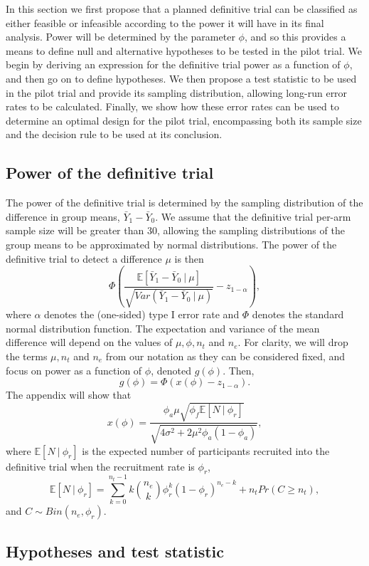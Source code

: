 \documentclass{article}
\begin{document}
In this section we first propose that a planned definitive trial can be classified as either feasible or infeasible according to the power it will have in its final analysis. Power will be determined by the parameter $\phi$, and so this provides a means to define null and alternative hypotheses to be tested in the pilot trial. We begin by deriving an expression for the definitive trial power as a function of $\phi$, and then go on to define hypotheses. We then propose a test statistic to be used in the pilot trial and provide its sampling distribution, allowing long-run error rates to be calculated. Finally, we show how these error rates can be used to determine an optimal design for the pilot trial, encompassing both its sample size and the decision rule to be used at its conclusion.

\subsection{Power of the definitive trial}\label{sec:power}

The power of the definitive trial is determined by the sampling distribution of the difference in group means, $\bar{Y}_1 - \bar{Y}_0$. We assume that the definitive trial per-arm sample size will be greater than 30, allowing the sampling distributions of the group means to be approximated by normal distributions. The power of the definitive trial to detect a difference $\mu$ is then
$$
\Phi \left(\frac{\mathbb{E}[\bar{Y}_1 - \bar{Y}_0 ~|~ \mu]}{\sqrt{Var(\bar{Y}_1 - \bar{Y}_0 ~|~ \mu)}} - z_{1-\alpha} \right),
$$
where $\alpha$ denotes the (one-sided) type I error rate and $\Phi$ denotes the standard normal distribution function. The expectation and variance of the mean difference will depend on the values of $\mu, \phi, n_t$ and $n_e$. For clarity, we will drop the terms $\mu, n_t$ and $n_e$ from our notation as they can be considered fixed, and focus on power as a function of $\phi$, denoted $g(\phi)$. Then,
$$
g(\phi) = \Phi \left( x(\phi) - z_{1-\alpha} \right).
$$
The appendix will show that
$$
x(\phi) =  \frac{ \phi_a\mu \sqrt{\phi_f \mathbb{E}[N ~|~ \phi_r]} } {\sqrt{4\sigma^2 + 2 \mu^2 \phi_a(1-\phi_a)}},
$$
where $\mathbb{E}[N ~|~ \phi_r]$ is the expected number of participants recruited into the definitive trial when the recruitment rate is $\phi_r$,
$$
\mathbb{E}[N ~|~ \phi_r] = \sum_{k=0}^{n_t-1} k{n_e \choose k} \phi_r^k (1-\phi_r)^{n_e - k} + n_t Pr(C \geq n_t),
$$
and $C \sim Bin(n_e, \phi_r)$.

\subsection{Hypotheses and test statistic}
\end{document}
